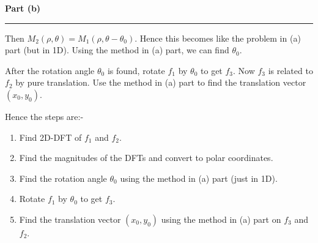 \documentclass[a4paper,12pt]{article}
\newenvironment{solution}[2][]{%
\begin{mdframed}[linecolor=blue!70!black, linewidth=2pt, roundcorner=10pt, backgroundcolor=yellow!10!white, skipabove=12pt, skipbelow=12pt]%
	\textbf{\large #2}
	\par\noindent\rule{\textwidth}{0.4pt}
}{
\end{mdframed}
}
\begin{document}
\begin{solution}{Part (b)}
	Then $M_2(\rho, \theta) = M_1(\rho, \theta - \theta_0)$. Hence this becomes like the problem in (a) part (but in 1D). Using the method in (a) part, we can find $\theta_0$.

	After the rotation angle $\theta_0$ is found, rotate $f_1$ by $\theta_0$ to get $f_3$. Now $f_3$ is related to $f_2$ by pure translation. Use the method in (a) part to find the translation vector $(x_0, y_0)$.

	Hence the steps are:-
	\begin{enumerate}
		\item Find 2D-DFT of $f_1$ and $f_2$.
		\item Find the magnitudes of the DFTs and convert to polar coordinates.
		\item Find the rotation angle $\theta_0$ using the method in (a) part (just in 1D).
		\item Rotate $f_1$ by $\theta_0$ to get $f_3$.
		\item Find the translation vector $(x_0, y_0)$ using the method in (a) part on $f_3$ and $f_2$.
	\end{enumerate}
\end{solution}
\end{document}
